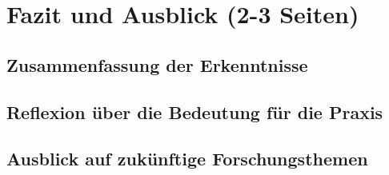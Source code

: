 \section{Fazit und Ausblick (2-3 Seiten)}
\subsection{Zusammenfassung der Erkenntnisse}
\subsection{Reflexion über die Bedeutung für die Praxis}
\subsection{Ausblick auf zukünftige Forschungsthemen}